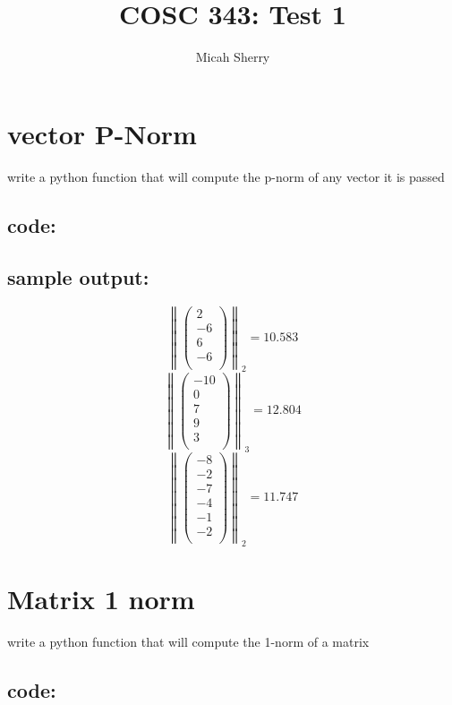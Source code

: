 \documentclass{article}
\title{COSC 343: Test 1}
\author{Micah Sherry}
\begin{document}
\maketitle

\section{vector P-Norm}
	write a python function that will compute the p-norm of any vector it is passed 
	\subsection*{code:}
	
	\subsection*{sample output:}
	$$ \left\| \begin{pmatrix}2 \\-6 \\6 \\-6 \\\end{pmatrix}\right\|_{2} = 10.583$$
	$$ \left\| \begin{pmatrix}-10 \\0 \\7 \\9 \\3 \\\end{pmatrix}\right\|_{3} = 12.804$$
	$$ \left\| \begin{pmatrix}-8 \\-2 \\-7 \\-4 \\-1 \\-2 \\\end{pmatrix}\right\|_{2} = 11.747$$

\section{Matrix 1 norm}
	write a python function that will compute the 1-norm of a matrix
	\subsection*{code:}
	
\end{document}
